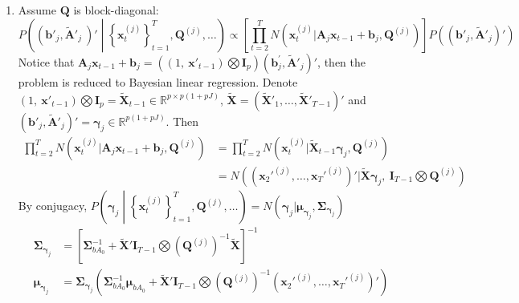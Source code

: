 \documentclass[]{article}
\begin{document}
\begin{enumerate}
	\item
	Assume \(\mathbf{Q}\) is block-diagonal:
	\[P\left( \left( \mathbf{b}'_{j}, {\widetilde{\mathbf{A}}'}_{j}\ \right)' \middle| \left\{ \mathbf{x}_{t}^{(j)} \right\}_{t = 1}^{T},\mathbf{Q}^{(j)},\ldots \right) \propto \left\lbrack \prod_{t = 2}^{T}{N\left( \mathbf{x}_{t}^{(j)}|\mathbf{A}_{j}\mathbf{x}_{t - 1} + \mathbf{b}_{j},\mathbf{Q}^{(j)} \right)} \right\rbrack P\left( \left( \mathbf{b}'_{j}, {\widetilde{\mathbf{A}}'}_{j} \right)' \right)\]
	Notice that \(\mathbf{A}_{j}\mathbf{x}_{t - 1} + \mathbf{b}_{j}\mathbf{=}\left( \left( 1,\ {\mathbf{x}'_{t - 1}} \right)\bigotimes\mathbf{I}_{p} \right)\left( \mathbf{b}_{j}^{\mathbf{'}}\mathbf{,}{\widetilde{\mathbf{A}}'}_{j} \right)'\), then the problem is reduced to Bayesian linear regression. Denote \(\left( 1,\ {\mathbf{x}'_{t - 1}} \right)\bigotimes\mathbf{I}_{p}\mathbf{=}{\widetilde{\mathbf{X}}}_{t - 1} \in \mathbb{R}^{p \times p(1 + pJ)}\),
	\(\widetilde{\mathbf{X}} = \left({\widetilde{\mathbf{X}}'}_{1},\ldots,{\widetilde{\mathbf{X}}'}_{T - 1} \right)'\)
	and\(\left( \mathbf{b}'_{j}, {\widetilde{\mathbf{A}}'}_{j} \right)' = \mathbf{\gamma}_{j} \in \mathbb{R}^{p(1 + pJ)}\).
	Then
	\begin{align*}
		\prod_{t = 2}^{T}{N\left( \mathbf{x}_{t}^{(j)}|\mathbf{A}_{j}\mathbf{x}_{t - 1} + \mathbf{b}_{j},\mathbf{Q}^{(j)} \right)} &= \prod_{t = 2}^{T}{N\left( \mathbf{x}_{t}^{(j)}|{\widetilde{\mathbf{X}}}_{t - 1}\mathbf{\gamma}_{j},\mathbf{Q}^{(j)} \right)}\\
		&= N\left( \left( {\mathbf{x}_{2}'^{(j)}},\ldots,{\mathbf{x}_{T}'^{(j)}} \right)'|\widetilde{\mathbf{X}}\bm{\gamma}_{j},\ \mathbf{I}_{T - 1}\bigotimes\mathbf{Q}^{(j)} \right)
	\end{align*}
	By conjugacy, \(P\left( \bm{\gamma}_{j} \middle| \left\{ \mathbf{x}_{t}^{(j)} \right\}_{t = 1}^{T},\mathbf{Q}^{(j)},\ldots \right) = N\left(\bm{\gamma}_{j}|\bm{\mu}_{\bm{\gamma}_{j}},\mathbf{\Sigma}_{\bm{\gamma}_{j}} \right)\)
	\begin{align*}
		\mathbf{\Sigma}_{\bm{\gamma}_{j}} &= \left\lbrack \mathbf{\Sigma}_{bA_{0}}^{- 1} + {\widetilde{\mathbf{X}}'}\mathbf{I}_{T - 1}\bigotimes\left( \mathbf{Q}^{(j)} \right)^{- 1}\widetilde{\mathbf{X}} \right\rbrack^{- 1}\\
		\bm{\mu}_{\bm{\gamma}_{j}} &= \mathbf{\Sigma}_{\bm{\gamma}_{j}}\left( \mathbf{\Sigma}_{bA_{0}}^{- 1}\bm{\mu}_{bA_{0}} + {\widetilde{\mathbf{X}}'}\mathbf{I}_{T - 1}\bigotimes\left( \mathbf{Q}^{(j)} \right)^{- 1}\left( {\mathbf{x}_{2}'^{(j)}},\ldots,{\mathbf{x}_{T}'^{(j)}} \right)' \right)
	\end{align*}


\end{enumerate}
\end{document}
